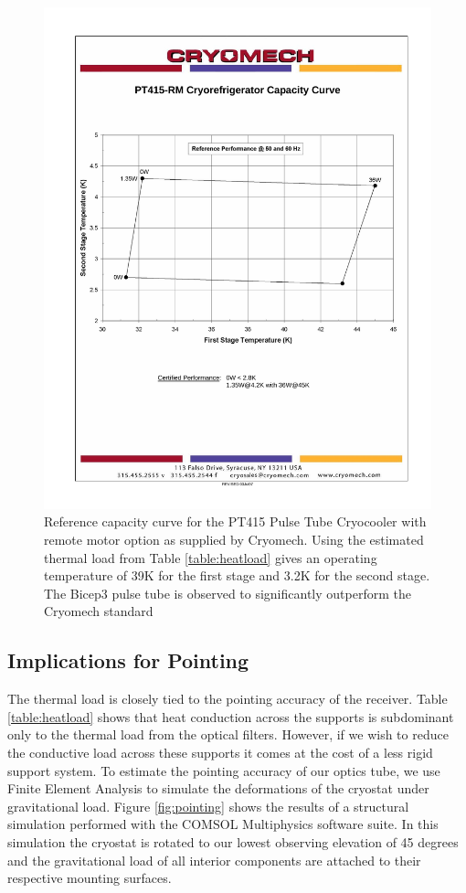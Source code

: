 \documentclass[12pt]{article}
\begin{document}
\begin{figure}
	\center
	\includegraphics[clip, trim=.8in 3.5in .7in 2.5in,  width=.7\textwidth]{PT415RM_cc.pdf}
	\caption{Reference capacity curve for the PT415 Pulse Tube Cryocooler with
	remote motor option as supplied by Cryomech. Using the estimated thermal
	load from Table \ref{table:heatload} gives an operating temperature of 39K
	for the first stage and 3.2K for the second stage. The Bicep3 pulse tube
	is observed to significantly outperform the Cryomech standard}
	\label{fig:capcurve}



\end{figure}



\subsection{Implications for Pointing}
The thermal load is closely tied to the pointing accuracy of the receiver.
Table \ref{table:heatload} shows that heat conduction across the supports is
subdominant only to the thermal load from the optical filters. However, if we
wish to reduce the conductive load across these supports it comes at the cost
of a less rigid support system. To estimate the pointing accuracy of our
optics tube, we use Finite Element Analysis to simulate the deformations of
the cryostat under gravitational load. Figure \ref{fig:pointing} shows the
results of a structural simulation performed with the COMSOL Multiphysics
software suite. In this simulation the cryostat is rotated to our lowest
observing elevation of 45 degrees and the gravitational load of all interior
components are attached to their respective mounting surfaces. 
\end{document}
